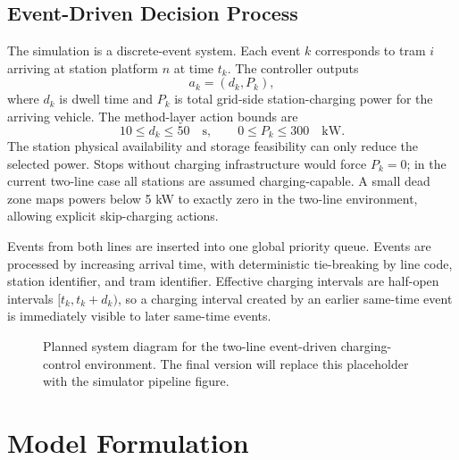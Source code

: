 \documentclass[conference]{IEEEtran}
\begin{document}
\subsection{Event-Driven Decision Process}
The simulation is a discrete-event system. Each event $k$ corresponds to tram $i$ arriving at station platform $n$ at time $t_k$. The controller outputs
\begin{equation}
    a_k = (d_k, P_k),
\end{equation}
where $d_k$ is dwell time and $P_k$ is total grid-side station-charging power for the arriving vehicle. The method-layer action bounds are
\begin{equation}
    10 \le d_k \le 50 \quad \mathrm{s}, \qquad 0 \le P_k \le 300 \quad \mathrm{kW}.
\end{equation}
The station physical availability and storage feasibility can only reduce the selected power. Stops without charging infrastructure would force $P_k=0$; in the current two-line case all stations are assumed charging-capable. A small dead zone maps powers below 5 kW to exactly zero in the two-line environment, allowing explicit skip-charging actions.

Events from both lines are inserted into one global priority queue. Events are processed by increasing arrival time, with deterministic tie-breaking by line code, station identifier, and tram identifier. Effective charging intervals are half-open intervals $[t_k,t_k+d_k)$, so a charging interval created by an earlier same-time event is immediately visible to later same-time events.

\begin{figure}[t]
\centering
{}
\caption{Planned system diagram for the two-line event-driven charging-control environment. The final version will replace this placeholder with the simulator pipeline figure.}
\label{fig:pipeline}
\end{figure}

\section{Model Formulation}
\end{document}
